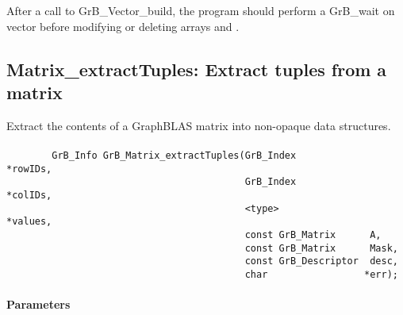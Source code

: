 
After a call to {\sf GrB\_Vector\_build}, the program should perform a 
{\sf GrB\_wait} on vector  before
modifying or deleting arrays  and .


\subsection{{\sf Matrix\_extractTuples}: Extract tuples from a matrix}
\label{Sec:Matrix_extractTuples}

Extract the contents of a GraphBLAS matrix into non-opaque data structures.

\paragraph{\syntax}

\begin{verbatim}
        GrB_Info GrB_Matrix_extractTuples(GrB_Index            *rowIDs,
                                          GrB_Index            *colIDs,
                                          <type>               *values, 
                                          const GrB_Matrix      A,
                                          const GrB_Matrix      Mask,
                                          const GrB_Descriptor  desc,
                                          char                 *err);
\end{verbatim}

\paragraph{Parameters}

